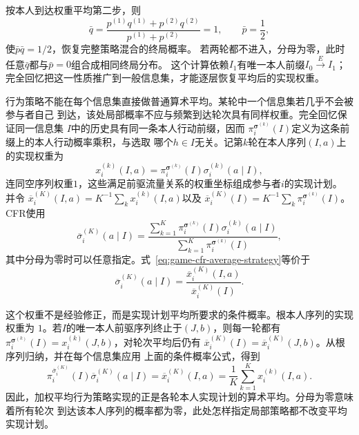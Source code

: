 按本人到达权重平均第二步，则
\[
 \bar q=
 \frac{p^{(1)}q^{(1)}+p^{(2)}q^{(2)}}{p^{(1)}+p^{(2)}}=1,
 \qquad \bar p=\frac12,
\]
使$\bar p\bar q=1/2$，恢复完整策略混合的终局概率。
若两轮都不进入，分母为零，此时任意$\bar q$都与$\bar p=0$组合成相同终局分布。
这个计算依赖$I_1$有唯一本人前缀$I_0\xrightarrow{E}I_1$；
完全回忆把这一性质推广到一般信息集，才能逐层恢复平均后的实现权重。

行为策略不能在每个信息集直接做普通算术平均。某轮中一个信息集若几乎不会被参与者自己
到达，该处局部概率不应与频繁到达轮次具有同样权重。完全回忆保证同一信息集
\(I\)中的历史具有同一条本人行动前缀，因而
\(\pi_i^{\bm{\sigma}^{(k)}}(I)\)定义为这条前缀上的本人行动概率乘积，与选取
哪个\(h\in I\)无关。记第\(k\)轮在本人序列\((I,a)\)上的实现权重为
\[
  x_i^{(k)}(I,a)
  =
  \pi_i^{\bm{\sigma}^{(k)}}(I)
  \sigma_i^{(k)}(a\mid I),
\]
连同空序列权重$1$，这些满足前驱流量关系的权重坐标组成参与者$i$的实现计划。
并令
\(\overline{x}_i^{(K)}(I,a)=K^{-1}\sum_k x_i^{(k)}(I,a)\)以及
\(\overline{x}_i^{(K)}(I)=K^{-1}\sum_k
\pi_i^{\bm{\sigma}^{(k)}}(I)\)。CFR使用
\begin{equation}
  \overline{\sigma}_i^{(K)}(a\mid I)
  =
  \frac{
    \sum_{k=1}^{K}
    \pi_i^{\bm{\sigma}^{(k)}}(I)
    \sigma_i^{(k)}(a\mid I)
  }{
    \sum_{k=1}^{K}
    \pi_i^{\bm{\sigma}^{(k)}}(I)
  },
  \label{eq:game-cfr-average-strategy}
\end{equation}
其中分母为零时可以任意指定。式~\eqref{eq:game-cfr-average-strategy}等价于
\[
  \overline{\sigma}_i^{(K)}(a\mid I)
  =
  \frac{\overline{x}_i^{(K)}(I,a)}{\overline{x}_i^{(K)}(I)}.
\]

这个权重不是经验修正，而是实现计划平均所要求的条件概率。根本人序列的实现权重为
\(1\)。若\(I\)的唯一本人前驱序列终止于\((J,b)\)，则每一轮都有
\(\pi_i^{\bm{\sigma}^{(k)}}(I)=x_i^{(k)}(J,b)\)，对轮次平均后仍有
\(\overline{x}_i^{(K)}(I)=\overline{x}_i^{(K)}(J,b)\)。从根序列归纳，并在每个信息集应用
上面的条件概率公式，得到
\begin{equation}
  \pi_i^{\overline{\sigma}_i^{(K)}}(I)
  \overline{\sigma}_i^{(K)}(a\mid I)
  =
  \overline{x}_i^{(K)}(I,a)
  =
  \frac{1}{K}\sum_{k=1}^{K}x_i^{(k)}(I,a).
  \label{eq:game-average-realization-plan}
\end{equation}
因此，加权平均行为策略实现的正是各轮本人实现计划的算术平均。分母为零意味着所有轮次
到达该本人序列的概率都为零，此处怎样指定局部策略都不改变平均实现计划。

